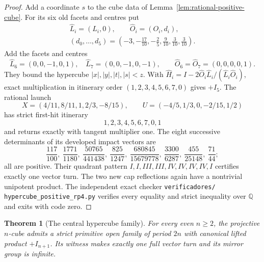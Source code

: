 \documentclass[11pt,a4paper]{article}
\theoremstyle{plain}
\newtheorem{theorem}{Theorem}[section]
\theoremstyle{definition}
\theoremstyle{remark}
\begin{document}
\begin{proof}
Add a coordinate $s$ to the cube data of
Lemma~\ref{lem:rational-positive-cube}.  For its six old facets and centres put
\[
 \begin{gathered}
 \widehat L_i=(L_i,0),\qquad \widehat O_i=(O_i,d_i),\\
 (d_0,\ldots,d_5)=\left(-3,-\frac{17}{10},-\frac25,
                         \frac9{10},\frac3{10},\frac3{10}\right).
 \end{gathered}
\]
Add the facets and centres
\[
 \widehat L_6=(0,0,-1,0,1),\quad
 \widehat L_7=(0,0,-1,0,-1),\qquad
 \widehat O_6=\widehat O_7=(0,0,0,0,1).
\]
They bound the hypercube $|x|,|y|,|t|,|s|<z$.  With
$\widehat H_i=I-2\widehat O_i\widehat L_i/(\widehat L_i\widehat O_i)$,
exact multiplication in itinerary order $(1,2,3,4,5,6,7,0)$ gives $+I_5$.
The rational launch
\[
 X=(4/11,8/11,1,2/3,-8/15),\qquad
 U=(-4/5,1/3,0,-2/15,1/2)
\]
has strict first-hit itinerary
\[
                         1,2,3,4,5,6,7,0,1
\]
and returns exactly with tangent multiplier one.  The eight successive
determinants of its developed impact vectors are
\[
 \frac{117}{100},\ \frac{1771}{1180},\ \frac{50765}{441438},\
 \frac{825}{1247},\ \frac{680845}{15679778},\ \frac{3300}{6287},\
 \frac{455}{25148},\ \frac{71}{44};
\]
all are positive.  Their quadrant pattern
$I,I,III,III,IV,IV,IV,IV,I$ certifies exactly one vector turn.  The two new
cap reflections again have a nontrivial unipotent product.  The independent
exact checker \texttt{verificadores/}\allowbreak
\texttt{hypercube\_positive\_rp4.py} verifies every equality and strict
inequality over $\mathbb Q$ and exits with code zero.
\end{proof}

\begin{theorem}[The central hypercube family]
\label{thm:central-hypercube}
For every even $n\ge2$, the projective $n$-cube admits a strict primitive open
family of period $2n$ with canonical lifted product $+I_{n+1}$.  Its witness
makes exactly one full vector turn and its mirror group is infinite.
\end{theorem}
\end{document}
